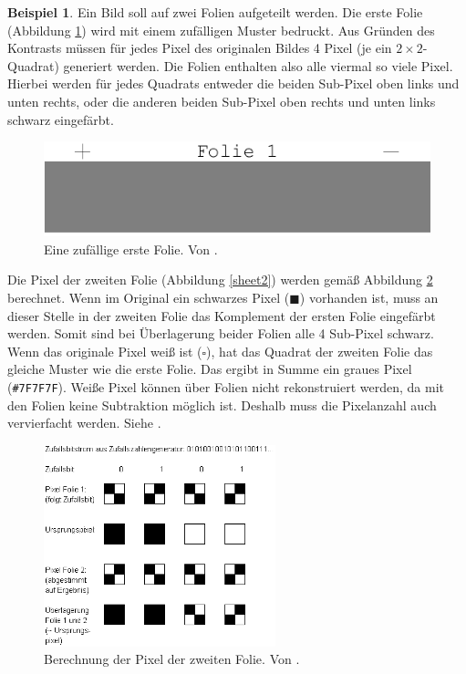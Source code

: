 \documentclass[12pt, a4paper, oneside, titlepage]{report}
\theoremstyle{definition}
\newtheorem{bsp}[lemma]{Beispiel}
\begin{document}
	\begin{bsp}
		Ein Bild soll auf zwei Folien aufgeteilt werden. Die erste Folie (Abbildung \ref{sheet1}) wird mit einem zufälligen Muster bedruckt. Aus Gründen des Kontrasts müssen für jedes Pixel des originalen Bildes 4 Pixel (je ein $ 2 \times 2 $-Quadrat) generiert werden. Die Folien enthalten also alle viermal so viele Pixel. Hierbei werden für jedes Quadrats entweder die beiden Sub-Pixel oben links und unten rechts, oder die anderen beiden Sub-Pixel oben rechts und unten links schwarz eingefärbt.
		
		\begin{figure}[H]
			\centering
			\includegraphics[width=1.\textwidth]{images/visual2.png}
			\caption{Eine zufällige erste Folie. Von \cite{visual}.}
			\label{sheet1}
		\end{figure}
		
		Die Pixel der zweiten Folie (Abbildung \ref{sheet2}) werden gemäß Abbildung \ref{generation-of-2nd-sheet} berechnet. Wenn im Original ein schwarzes Pixel ($ \blacksquare $) vorhanden ist, muss an dieser Stelle in der zweiten Folie das Komplement der ersten Folie eingefärbt werden. Somit sind bei Überlagerung beider Folien alle 4 Sub-Pixel schwarz. Wenn das originale Pixel weiß ist ($ \square $), hat das Quadrat der zweiten Folie das gleiche Muster wie die erste Folie. Das ergibt in Summe ein graues Pixel (\texttt{\#7F7F7F}). Weiße Pixel können über Folien nicht rekonstruiert werden, da mit den Folien keine Subtraktion möglich ist. Deshalb muss die Pixelanzahl auch vervierfacht werden. Siehe \cite{visual}.
		
		\begin{figure}[H]
			\centering
			\includegraphics[width=0.6\textwidth]{images/visual1.png}
			\caption{Berechnung der Pixel der zweiten Folie. Von \cite{visual}.}
			\label{generation-of-2nd-sheet}
		\end{figure}
	

\end{bsp}
\end{document}
